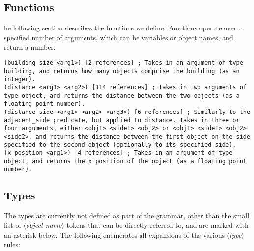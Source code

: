 \documentclass{article}
\newcommand{\dsl}[1]{{\it $\langle$#1$\rangle$}}
\begin{document}
\subsection{Functions} \label{sec:functions}
he following section describes the functions we define.
        Functions operate over a specified number of arguments, which can be variables or object names, and return a number.
\begin{lstlisting}
(building_size <arg1>) [2 references] ; Takes in an argument of type building, and returns how many objects comprise the building (as an integer).
(distance <arg1> <arg2>) [114 references] ; Takes in two arguments of type object, and returns the distance between the two objects (as a floating point number).
(distance_side <arg1> <arg2> <arg3>) [6 references] ; Similarly to the adjacent_side predicate, but applied to distance. Takes in three or four arguments, either <obj1> <side1> <obj2> or <obj1> <side1> <obj2> <side2>, and returns the distance between the first object on the side specified to the second object (optionally to its specified side).
(x_position <arg1>) [4 references] ; Takes in an argument of type object, and returns the x position of the object (as a floating point number).
\end{lstlisting}



\subsection{Types} \label{sec:types}
The types are currently not defined as part of the grammar, other than the small list of \dsl{object-name} tokens that can be directly referred to, and are marked with an asterisk below.
        The following enumerates all expansions of the various \dsl{type} rules:
\end{document}
